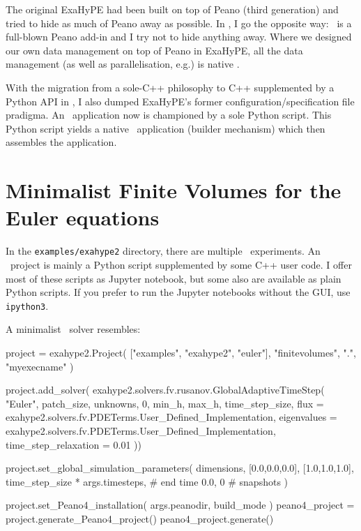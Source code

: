 The original ExaHyPE had been built on top of Peano (third generation) and tried
to hide as much of Peano away as possible.
In \ExaHyPE, I go the opposite way: \ExaHyPE\ is a full-blown Peano add-in and I
try not to hide anything away.
Where we designed our own data management on top of Peano in ExaHyPE, all the
data management (as well as parallelisation, e.g.) is native \Peano.


With the migration from a sole-C++ philosophy to C++ supplemented by a Python
API in \Peano, I also dumped ExaHyPE's former configuration/specification file
pradigma.
An \ExaHyPE\ application now is championed by a sole Python script.
This Python script yields a native \Peano\ application (builder mechanism) which
then assembles the application.



\section{Minimalist Finite Volumes for the Euler equations}
\label{section:exahype:fv}


\begin{remark}
 In the \texttt{examples/exahype2} directory, there are multiple \ExaHyPE\
 experiments. An \ExaHyPE\ project is mainly a Python script supplemented by
 some C++ user code. I offer most of these scripts as Jupyter notebook, but some
 also are available as plain Python scripts. If you prefer to run the Jupyter
 notebooks without the GUI, use \texttt{ipython3}.
\end{remark}


\noindent
A minimalist \ExaHyPE\ solver resembles:
\begin{code}
project = exahype2.Project( ["examples", "exahype2", "euler"], "finitevolumes", ".", "myexecname" )

project.add_solver(  exahype2.solvers.fv.rusanov.GlobalAdaptiveTimeStep(
  "Euler",
  patch_size,
  unknowns, 0,
  min_h, max_h,
  time_step_size,
  flux = exahype2.solvers.fv.PDETerms.User_Defined_Implementation,
  eigenvalues = exahype2.solvers.fv.PDETerms.User_Defined_Implementation,
  time_step_relaxation = 0.01
))

project.set_global_simulation_parameters(
  dimensions, [0.0,0.0,0.0], [1.0,1.0,1.0],
  time_step_size * args.timesteps, # end time
  0.0, 0                           # snapshots
)

project.set_Peano4_installation( args.peanodir, build_mode )
peano4_project = project.generate_Peano4_project()
peano4_project.generate()
\end{code}

